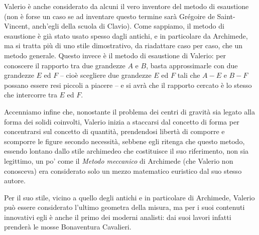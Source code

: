 \par Valerio \`e anche considerato da alcuni il vero inventore del metodo di esaustione (non \`e forse un caso se ad inventare questo termine sar\`a Gr\'egoire de Saint-Vincent, anch'egli della scuola di Clavio). Come sappiamo, il metodo di esaustione \`e gi\`a stato usato spesso dagli antichi, e in particolare da Archimede, ma si tratta pi\`u di uno stile dimostrativo, da riadattare caso per caso, che un metodo generale. Questo invece \`e il metodo di esaustione di Valerio: per conoscere il rapporto tra due grandezze $A$ e $B$, basta approssimarle con due grandezze $E$ ed $F$ -- cio\`e scegliere due grandezze $E$ ed $F$ tali che $A - E$ e $B - F$ possano essere resi piccoli a piacere -- e si avr\`a che il rapporto cercato \`e lo stesso che intercorre tra $E$ ed $F$.
\par Accenniamo infine che, nonostante il problema dei centri di gravit\`a sia legato alla forma dei solidi coinvolti, Valerio inizia a staccarsi dal concetto di forma per concentrarsi sul concetto di quantit\`a, prendendosi libert\`a di comporre e scomporre le figure secondo necessit\`a, sebbene egli ritenga che questo metodo, essendo lontano dallo stile archimedeo che costituisce il suo riferimento, non sia legittimo, un po' come il \textit{Metodo meccanico} di Archimede (che Valerio non conosceva) era considerato solo un mezzo matematico euristico dal suo stesso autore.
\par Per il suo stile, vicino a quello degli antichi e in particolare di Archimede, Valerio pu\`o essere considerato l'ultimo geometra della misura, ma per i suoi contenuti innovativi egli \`e anche il primo dei moderni analisti: dai suoi lavori infatti prender\`a le mosse Bonaventura Cavalieri.
